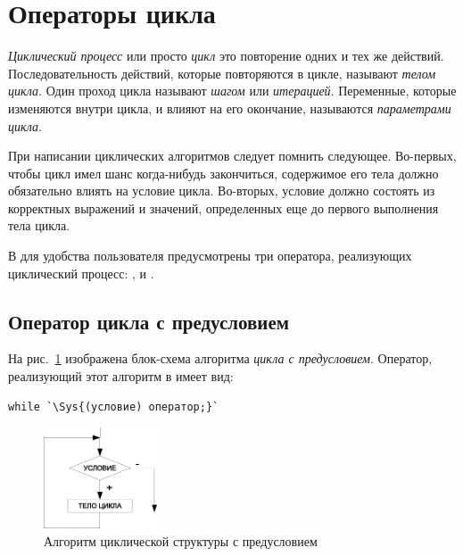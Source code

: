\section[Операторы цикла]{Операторы цикла}
\emph{Циклический процесс} или просто
\emph{цикл}  это повторение одних и тех же действий. Последовательность
действий, которые повторяются в цикле, называют \emph{телом цикла}. Один проход цикла называют
\emph{шагом} или \emph{итерацией}. Переменные, которые изменяются внутри цикла, и влияют на
его окончание, называются \emph{параметрами цикла}. 

При написании циклических алгоритмов следует помнить следующее. Во-первых, чтобы цикл имел шанс когда-нибудь
закончиться, содержимое его тела должно обязательно влиять на условие цикла. Во-вторых, условие должно состоять из
корректных выражений и значений, определенных еще до первого выполнения тела цикла. 

В  для удобства пользователя предусмотрены три оператора, реализующих циклический процесс: ,
 и .

\subsection[Оператор цикла с предусловием]{Оператор цикла с предусловием}
На рис.~\ref{ch03:refDrawing21} изображена блок-схема алгоритма \emph{цикла с предусловием}. Оператор, реализующий этот алгоритм в  имеет вид:
\begin{lstlisting}
while `\Sys{(условие) оператор;}`
\end{lstlisting}

\begin{figure}[htb]
\begin{center}
\includegraphics[width=0.3\textwidth]{img/ris_3_22}
\caption{Алгоритм циклической структуры с предусловием}
\label{ch03:refDrawing21}
\end{center}
\end{figure}

